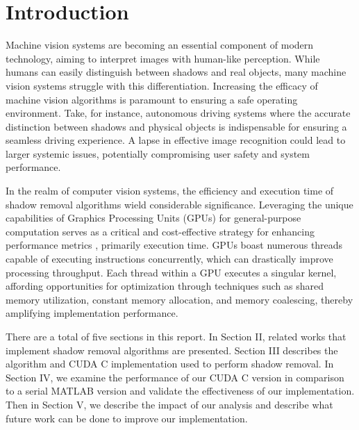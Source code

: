 \documentclass[conference]{IEEEtran}
\begin{document}
   \section{Introduction}
      Machine vision systems are becoming an essential component of modern technology, aiming to interpret images with human-like perception. While humans can easily distinguish between shadows and real objects, many machine vision systems struggle with this differentiation. Increasing the efficacy of machine vision algorithms is paramount to ensuring a safe operating environment. Take, for instance, autonomous driving systems where the accurate distinction between shadows and physical objects is indispensable for ensuring a seamless driving experience. A lapse in effective image recognition could lead to larger systemic issues, potentially compromising user safety and system performance.

      In the realm of computer vision systems, the efficiency and execution time of shadow removal algorithms wield considerable significance. Leveraging the unique capabilities of Graphics Processing Units (GPUs) for general-purpose computation serves as a critical and cost-effective strategy for enhancing performance metrics \cite{GpuGems3}, primarily execution time. GPUs boast numerous threads capable of executing instructions concurrently, which can drastically improve processing throughput. Each thread within a GPU executes a singular kernel, affording opportunities for optimization through techniques such as shared memory utilization, constant memory allocation, and memory coalescing, thereby amplifying implementation performance.

      There are a total of five sections in this report. In Section II, related works that implement shadow removal algorithms are presented. Section III describes the algorithm and CUDA C implementation used to perform shadow removal. In Section IV, we examine the performance of our CUDA C version in comparison to a serial MATLAB version and validate the effectiveness of our implementation. Then in Section V, we describe the impact of our analysis and describe what future work can be done to improve our implementation.
\end{document}
